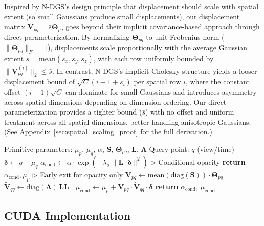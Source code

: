 \documentclass{article}
\newcommand{\return}{\textbf{return }}
\newcommand{\Comment}[1]{\hfill $\triangleright$ #1}
\newcommand{\dgs}{\textit{d}GS\xspace}
\newcommand{\dgso}{\textit{d}GS-O\xspace}
\theoremstyle{plain}
\theoremstyle{definition}
\theoremstyle{remark}
\begin{document}
Inspired by N-DGS's design principle that displacement should scale with spatial extent (so small Gaussians produce small displacements), our displacement matrix $\mathbf{V}_{pq} = \bar{s} \boldsymbol{\Theta}_{pq}$ goes beyond their implicit covariance-based approach through direct parameterization. By normalizing $\boldsymbol{\Theta}_{pq}$ to unit Frobenius norm ($\|\boldsymbol{\Theta}_{pq}\|_F = 1$), displacements scale proportionally with the average Gaussian extent $\bar{s} = \text{mean}(s_x, s_y, s_z)$, with each row uniformly bounded by $\|\mathbf{V}_{pq}^{(i)}\|_2 \leq \bar{s}$. In contrast, N-DGS's implicit Cholesky structure yields a looser displacement bound of $\sqrt{C}(i{-}1 + s_i)$ per spatial row $i$, where the constant offset $(i{-}1)\sqrt{C}$ can dominate for small Gaussians and introduces asymmetry across spatial dimensions depending on dimension ordering. Our direct parameterization provides a tighter bound ($\bar{s}$) with no offset and uniform treatment across all spatial dimensions, better handling anisotropic Gaussians. (See Appendix~\ref{sec:spatial_scaling_proof} for the full derivation.)


\begin{algorithm}[tb]
\caption{\dgs{} Conditional Slicing}
\label{alg:slice}
\begin{algorithmic}[1]
\REQUIRE Primitive parameters: $\mu_p$, $\mu_q$, $\alpha$, $\mathbf{S}$, $\boldsymbol{\Theta}_{pq}$, $\mathbf{L}$, $\boldsymbol{\Lambda}$
\REQUIRE Query point: $q$ (view/time)
\STATE $\boldsymbol{\delta} \gets q - \mu_q$ %
\STATE $\alpha_{\text{cond}} \gets \alpha \cdot \exp(-\lambda_o\,\|\mathbf{L}^\top \boldsymbol{\delta}\|^2)$ \Comment{Conditional opacity}
\IF{\dgso{} variant}
    \STATE \return  $\alpha_{\text{cond}}, \mu_p$ \Comment{Early exit for opacity only}
\ENDIF
\STATE $\mathbf{V}_{pq} \gets \text{mean}(\text{diag}(\mathbf{S})) \cdot \boldsymbol{\Theta}_{pq}$ %
\STATE $\tilde{\mathbf{V}}_{qq} \gets \mathrm{diag}(\boldsymbol{\Lambda})\,\mathbf{L}\mathbf{L}^\top$ %
\STATE $\mu_{\text{cond}} \gets \mu_p + \mathbf{V}_{pq} \cdot \tilde{\mathbf{V}}_{qq} \cdot \boldsymbol{\delta}$ %
\STATE \return $\alpha_{\text{cond}}$, $\mu_{\text{cond}}$
\end{algorithmic}
\end{algorithm}
\setlength{\textfloatsep}{22pt}


\subsection{CUDA Implementation}
\end{document}
